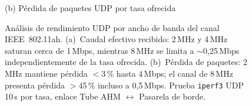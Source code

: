 \begin{figure}[htbp]

\vspace{3mm}
{\small (b) P\'{e}rdida de paquetes UDP por tasa ofrecida}

\caption[An\'{a}lisis UDP por ancho de banda HaLow]{An\'{a}lisis de rendimiento UDP por ancho de banda del canal IEEE~802.11ah.
(a)~Caudal efectivo recibido: 2\,MHz y 4\,MHz saturan cerca de 1\,Mbps, mientras 8\,MHz se limita a $\sim$0{,}25\,Mbps independientemente de la tasa ofrecida.
(b)~P\'{e}rdida de paquetes: 2\,MHz mantiene p\'{e}rdida $<$3\,\% hasta 4\,Mbps;
el canal de 8\,MHz presenta p\'{e}rdida $>$45\,\% incluso a 0{,}5\,Mbps.
Prueba \texttt{iperf3} UDP 10\,s por tasa, enlace Tube AHM $\leftrightarrow$ Pasarela de borde.}
\label{fig:halow-udp-analysis}
\end{figure}
